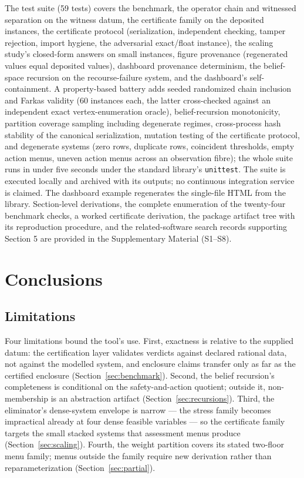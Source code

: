 \documentclass[3p,11pt]{elsarticle}
\begin{document}
The test suite (59 tests) covers the benchmark, the operator chain and
witnessed separation on the witness datum, the certificate family on the
deposited instances, the certificate protocol (serialization, independent
checking, tamper rejection, import hygiene, the adversarial exact/float
instance), the scaling study's closed-form answers on small instances,
figure provenance (regenerated values equal deposited values), dashboard
provenance determinism, the belief-space recursion on the recourse-failure
system, and the dashboard's self-containment. A property-based battery
adds seeded randomized chain inclusion and Farkas validity (60 instances
each, the latter cross-checked against an independent exact
vertex-enumeration oracle), belief-recursion monotonicity, partition
coverage sampling including degenerate regimes, cross-process hash
stability of the canonical serialization, mutation testing of the
certificate protocol, and degenerate systems (zero rows, duplicate rows,
coincident thresholds, empty action menus, uneven action menus across an
observation fibre); the whole suite runs in under five seconds under the standard library's \texttt{unittest}. The suite
is executed locally and archived with its outputs; no continuous
integration service is claimed.
The dashboard example regenerates the single-file HTML from the library.
Section-level derivations, the complete enumeration of the twenty-four
benchmark checks, a worked certificate derivation, the package artifact
tree with its reproduction procedure, and the related-software search
records supporting Section 5 are provided in the Supplementary Material
(S1--S8).

\section{Conclusions}\label{sec:conclusions}

\subsection{Limitations}

Four limitations bound the tool's use. First, exactness is relative to
the supplied datum: the certification layer validates verdicts against
declared rational data, not against the modelled system, and enclosure
claims transfer only as far as the certified enclosure
(Section~\ref{sec:benchmark}). Second, the belief recursion's
completeness is conditional on the safety-and-action quotient; outside
it, non-membership is an abstraction artifact
(Section~\ref{sec:recursions}). Third, the eliminator's dense-system
envelope is narrow --- the stress family becomes impractical already at
four dense feasible variables --- so the certificate family targets the
small stacked systems that assessment menus produce
(Section~\ref{sec:scaling}). Fourth, the weight partition covers its
stated two-floor menu family; menus outside the family require new
derivation rather than reparameterization (Section~\ref{sec:partial}).
\end{document}
